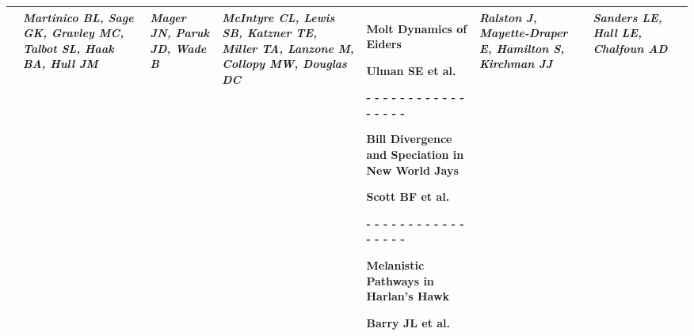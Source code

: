 \begin{tabular}{|x{0.8cm}|x{2.65cm}|x{2.65cm}|a{2.65cm}|y{2.65cm}|x{2.65cm}|x{2.65cm}|@{}m{0pt}@{}}
& \par \vspace{8pt} \textit{Martinico BL, Sage GK, Gravley MC, Talbot SL, Haak BA, Hull JM} &  \par \vspace{8pt} \textit{Mager JN, Paruk JD, Wade B} &  \par \vspace{8pt} \textit{McIntyre CL, Lewis SB, Katzner TE, Miller TA, Lanzone M, Collopy MW, Douglas DC} & \scriptsize Molt Dynamics of Eiders\par \tiny Ulman SE et al.\par - - - - - - - - - - - - - - - - - \par \vspace{2pt} \scriptsize Bill Divergence and Speciation in New World Jays\par \tiny Scott BF et al.\par - - - - - - - - - - - - - - - - - \par \vspace{2pt} \scriptsize Melanistic Pathways in Harlan's Hawk\par \tiny Barry JL et al. &  \par \vspace{8pt} \textit{Ralston J, Mayette-Draper E, Hamilton S, Kirchman JJ} &  \par \vspace{8pt} \textit{Sanders LE, Hall LE, Chalfoun AD}&\\[25ex]
\hline

\end{tabular}

